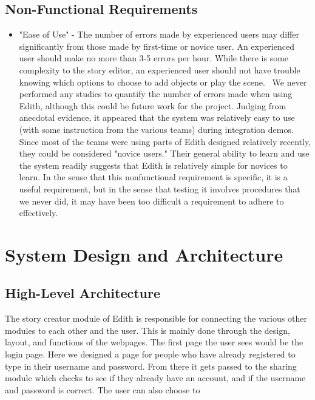 \documentclass[12pt]{article}
\begin{document}
\subsection{Non-Functional Requirements}
\begin{itemize}
\item "Ease of Use" - The number of errors made by experienced users may differ significantly from those made by first-time or novice user. An experienced user should make no more than 3-5 errors per hour. While there is some complexity to the story editor, an experienced user should not have trouble knowing which options to choose to add objects or play the scene.
\ We never performed any studies to quantify the number of errors made when using Edith, although this could be future work for the project. Judging from anecdotal evidence, it appeared that the system was relatively easy to use (with some instruction from the various teams) during integration demos. Since most of the teams were using parts of Edith designed relatively recently, they could be considered "novice users." Their general ability to learn and use the system readily suggests that Edith is relatively simple for novices to learn. In the sense that this nonfunctional requirement is specific, it is a useful requirement, but in the sense that testing it involves procedures that we never did, it may have been too difficult a requirement to adhere to effectively.

\end{itemize}
\section{System Design and Architecture}

\subsection{High-Level Architecture}
The story creator module of Edith is responsible for connecting the various other modules to each other and the user. This is mainly done through the design, layout, and functions of the webpages. The first page the user sees would be the login page. Here we designed a page for people who have already registered to type in their username and password. From there it gets passed to the sharing module which checks to see if they already have an account, and if the username and password is correct. The user can also choose to 
\end{document}
